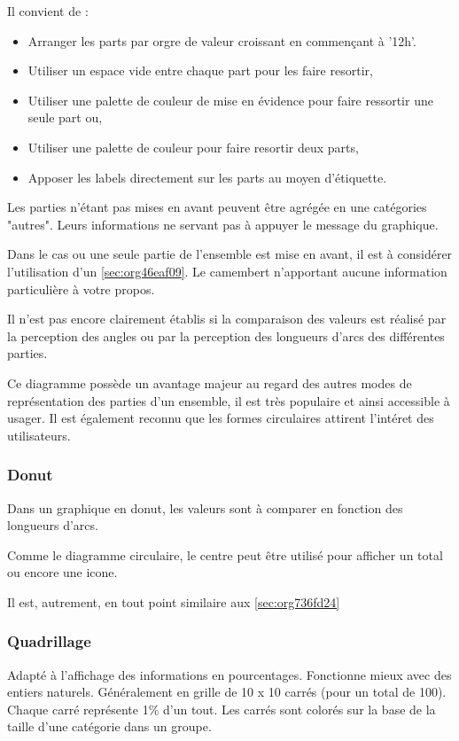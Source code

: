 \documentclass[a4paper,12pt]{article}
\begin{document}
\begin{multicols}{2}
Il convient de :
\begin{itemize}
\item Arranger les parts par orgre de valeur croissant en commençant à '12h'. \autocite{jonathanschwabishParttowhole2021}
\item Utiliser un espace vide entre chaque part pour les faire resortir, \autocite{sosulskiGraphics2019}
\item Utiliser une palette de couleur de mise en évidence pour faire ressortir une seule part ou,
\item Utiliser une palette de couleur pour faire resortir deux parts,
\item Apposer les labels directement sur les parts au moyen d'étiquette. \autocite{sosulskiGraphics2019}
\end{itemize}

Les parties n'étant pas mises en avant peuvent être agrégée en une catégories "autres". Leurs informations ne servant pas à appuyer le message du graphique. \autocite{jonathanschwabishParttowhole2021}

Dans le cas ou une seule partie de l'ensemble est mise en avant, il est à considérer l'utilisation d'un \ref{sec:org46eaf09}. Le camembert n'apportant aucune information particulière à votre propos.

Il n'est pas encore clairement établis si la comparaison des valeurs est réalisé par la perception des angles ou par la perception des longueurs d'arcs des différentes parties.\autocite{jonathanschwabishParttowhole2021}

Ce diagramme possède un avantage majeur au regard des autres modes de représentation des parties d'un ensemble, il est très populaire et ainsi accessible à usager. \autocite{jonathanschwabishParttowhole2021} Il est également reconnu que les formes circulaires attirent l'intéret des utilisateurs.\autocite{jonathanschwabishParttowhole2021}
\subsubsection{Donut}
\label{sec:org08b0b5d}
Dans un graphique en donut, les valeurs sont à comparer en fonction des longueurs d'arcs.

Comme le diagramme circulaire, le centre peut être utilisé pour afficher un total ou encore une icone. \autocite{alansmithLexiqueVisuel}

Il est, autrement, en tout point similaire aux \ref{sec:org736fd24}
\subsubsection{Quadrillage}
\label{sec:orgafda470}
Adapté à l'affichage des informations en pourcentages. Fonctionne mieux avec des entiers naturels. \autocite{alansmithLexiqueVisuel} Généralement en grille de 10 x 10 carrés (pour un total de 100). Chaque carré représente 1\% d'un tout. Les carrés sont colorés sur la base de la taille d'une catégorie dans un groupe. \autocite{mikeyiHowChooseRight2020}

\end{multicols}
\end{document}
